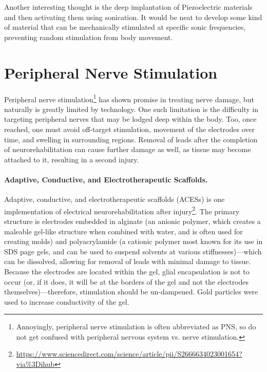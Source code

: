 \documentclass[12pt]{report}
\begin{document}
Another interesting thought is the deep implantation of Piezoelectric materials and then activating them using sonication. It would be neat to develop some kind of material that can be mechanically stimulated at specific sonic frequencies, preventing random stimulation from body movement. 


\chapter{Peripheral Nerve Stimulation} 
Peripheral nerve stimulation\footnote{Annoyingly, peripheral nerve stimulation is often abbreviated as PNS, so do not get confused with peripheral nervous system vs. nerve stimulation.} has shown promise in treating nerve damage, but naturally is greatly limited by technology. One such limitation is the difficulty in targeting peripheral nerves that may be lodged deep within the body. Too, once reached, one must avoid off-target stimulation, movement of the electrodes over time, and swelling in surrounding regions. Removal of leads after the completion of neurorehabilitation can cause further damage as well, as tissue may become attached to it, resulting in a second injury. 


\subsubsection{Adaptive, Conductive, and
Electrotherapeutic Scaffolds.}
Adaptive, conductive, and electrotherapeutic scaffolds (ACESs) is one implementation of electrical neurorehabilitation after injury\footnote{\url{https://www.sciencedirect.com/science/article/pii/S2666634023001654?via\%3Dihub}}. The primary structure is electrodes embedded in alginate (an anionic polymer, which creates a maleable gel-like structure when combined with water, and is often used for creating molds) and polyacrylamide (a cationic polymer most known for its use in SDS page gels, and can be used to suspend solvents at various stiffnesses)---which can be dissolved, allowing for removal of leads with minimal damage to tissue. Because the electrodes are located within the gel, glial encapsulation is not to occur (or, if it does, it will be at the borders of the gel and not the electrodes themselves)---therefore, stimulation should be un-dampened. Gold particles were used to increase conductivity of the gel.\newline
\end{document}

